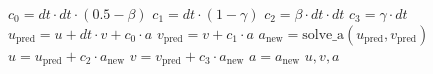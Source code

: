 %
%
%



\begin{algorithmic}
\State $c_0 = dt \cdot dt \cdot (0.5 - \beta)$                              %
\State $c_1 = dt \cdot (1 - \gamma)$                                        %
\State $c_2 = \beta \cdot dt \cdot dt$                                      %
\State $c_3 = \gamma \cdot dt$                                              %
\State $u_{\text{pred}} = u + dt \cdot v + c_0 \cdot a$                     %
\State $v_{\text{pred}} = v + c_1 \cdot a$                                  %
\State $a_{\text{new}} = \text{solve\_a}(u_{\text{pred}}, v_{\text{pred}})$ %
\State $u = u_{\text{pred}} + c_2 \cdot a_{\text{new}}$                     %
\State $v = v_{\text{pred}} + c_3 \cdot a_{\text{new}}$                     %
\State $a = a_{\text{new}}$                                                 %
\Return $u, v, a$
\end{algorithmic}
